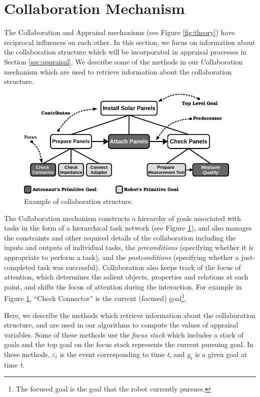\documentclass[12pt]{report}
\begin{document}
\section{Collaboration Mechanism}
\label{sec:collaboration-mechanism}
The Collaboration and Appraisal mechanisms (see Figure \ref{fig:theory}) have
reciprocal influences on each other. In this section, we focus on information
about the collaboration structure which will be incorporated in appraisal
processes in Section \ref{sec:appraisal}. We describe some of the methods in our
Collaboration mechanism which are used to retrieve information about the
collaboration structure.

\begin{figure}[t]
  \centering
  \includegraphics[width=0.97\textwidth]{figure/collaborationStructure-small-croped.pdf}
  \caption{Example of collaboration structure.}
  \label{fig:cs}
  \vspace*{-2mm}
\end{figure}

The Collaboration mechanism constructs a hierarchy of goals associated with
tasks in the form of a hierarchical task network (see Figure \ref{fig:cs}), and
also manages the constraints and other required details of the collaboration
including the inputs and outputs of individual tasks, the \textit{preconditions}
(specifying whether it is appropriate to perform a task), and the
\textit{postconditions} (specifying whether a just-completed task was
successful). Collaboration also keeps track of the focus of attention, which
determines the salient objects, properties and relations at each point, and
shifts the focus of attention during the interaction. For example in Figure
\ref{fig:cs}, ``Check Connector'' is the current (focused) goal\footnote{The
focused goal is the goal that the robot currently pursues.}.

Here, we describe the methods which retrieve information about the collaboration
structure, and are used in our algorithms to compute the values of appraisal
variables. Some of these methods use the \textit{focus stack} which includes a
stack of goals and the top goal on the focus stack represents the current
pursuing goal. In these methods, $\varepsilon_t$ is the event corresponding to
time \textit{t}, and $g_t$ is a given goal at time \textit{t}.
\end{document}
